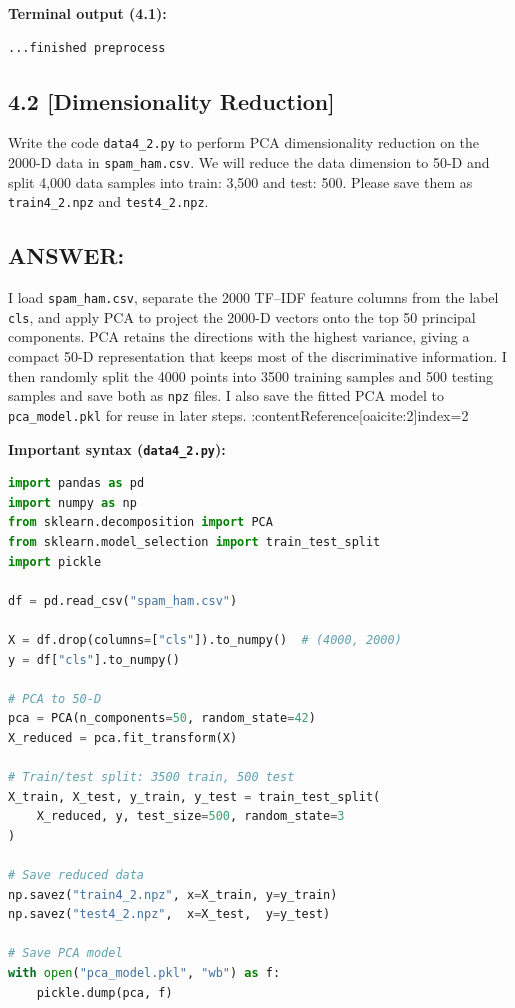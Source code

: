 \documentclass[12pt]{article}
\begin{document}
\textbf{Terminal output (4.1):}
\begin{lstlisting}
...finished preprocess
\end{lstlisting}

\subsection*{4.2 [Dimensionality Reduction]}
Write the code \texttt{data4\_2.py} to perform PCA dimensionality reduction on the 2000-D data in \texttt{spam\_ham.csv}. We will reduce the data dimension to 50-D and split 4,000 data samples into train: 3,500 and test: 500. Please save them as \texttt{train4\_2.npz} and \texttt{test4\_2.npz}.

\subsection*{ANSWER:}
I load \texttt{spam\_ham.csv}, separate the 2000 TF--IDF feature columns from
the label \texttt{cls}, and apply PCA to project the 2000-D vectors onto the
top 50 principal components. PCA retains the directions with the highest
variance, giving a compact 50-D representation that keeps most of the
discriminative information. I then randomly split the 4000 points into
3500 training samples and 500 testing samples and save both as \texttt{npz}
files. I also save the fitted PCA model to \texttt{pca\_model.pkl} for reuse
in later steps. :contentReference[oaicite:2]{index=2}

\textbf{Important syntax (\texttt{data4\_2.py}):}
\begin{lstlisting}[language=Python]
import pandas as pd
import numpy as np
from sklearn.decomposition import PCA
from sklearn.model_selection import train_test_split
import pickle

df = pd.read_csv("spam_ham.csv")

X = df.drop(columns=["cls"]).to_numpy()  # (4000, 2000)
y = df["cls"].to_numpy()

# PCA to 50-D
pca = PCA(n_components=50, random_state=42)
X_reduced = pca.fit_transform(X)

# Train/test split: 3500 train, 500 test
X_train, X_test, y_train, y_test = train_test_split(
    X_reduced, y, test_size=500, random_state=3
)

# Save reduced data
np.savez("train4_2.npz", x=X_train, y=y_train)
np.savez("test4_2.npz",  x=X_test,  y=y_test)

# Save PCA model
with open("pca_model.pkl", "wb") as f:
    pickle.dump(pca, f)
\end{lstlisting}
\end{document}
